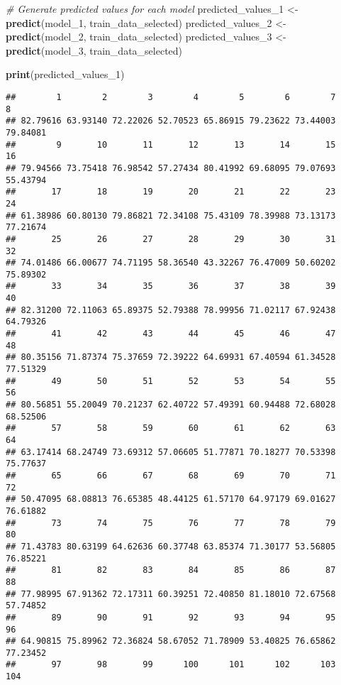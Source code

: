\documentclass[
]{article}
\newenvironment{Shaded}{\begin{snugshade}}{\end{snugshade}}
\newcommand{\CommentTok}[1]{\textcolor[rgb]{0.56,0.35,0.01}{\textit{#1}}}
\newcommand{\FunctionTok}[1]{\textcolor[rgb]{0.13,0.29,0.53}{\textbf{#1}}}
\newcommand{\NormalTok}[1]{#1}
\newcommand{\OtherTok}[1]{\textcolor[rgb]{0.56,0.35,0.01}{#1}}
\begin{document}
\begin{Shaded}
\begin{Highlighting}[]
\CommentTok{\# Generate predicted values for each model}
\NormalTok{predicted\_values\_1 }\OtherTok{\textless{}{-}} \FunctionTok{predict}\NormalTok{(model\_1, train\_data\_selected)}
\NormalTok{predicted\_values\_2 }\OtherTok{\textless{}{-}} \FunctionTok{predict}\NormalTok{(model\_2, train\_data\_selected)}
\NormalTok{predicted\_values\_3 }\OtherTok{\textless{}{-}} \FunctionTok{predict}\NormalTok{(model\_3, train\_data\_selected)}

\FunctionTok{print}\NormalTok{(predicted\_values\_1)}
\end{Highlighting}
\end{Shaded}

\begin{verbatim}
##        1        2        3        4        5        6        7        8 
## 82.79616 63.93140 72.22026 52.70523 65.86915 79.23622 73.44003 79.84081 
##        9       10       11       12       13       14       15       16 
## 79.94566 73.75418 76.98542 57.27434 80.41992 69.68095 79.07693 55.43794 
##       17       18       19       20       21       22       23       24 
## 61.38986 60.80130 79.86821 72.34108 75.43109 78.39988 73.13173 77.21674 
##       25       26       27       28       29       30       31       32 
## 74.01486 66.00677 74.71195 58.36540 43.32267 76.47009 50.60202 75.89302 
##       33       34       35       36       37       38       39       40 
## 82.31200 72.11063 65.89375 52.79388 78.99956 71.02117 67.92438 64.79326 
##       41       42       43       44       45       46       47       48 
## 80.35156 71.87374 75.37659 72.39222 64.69931 67.40594 61.34528 77.51329 
##       49       50       51       52       53       54       55       56 
## 80.56851 55.20049 70.21237 62.40722 57.49391 60.94488 72.68028 68.52506 
##       57       58       59       60       61       62       63       64 
## 63.17414 68.24749 73.69312 57.06605 51.77871 70.18277 70.53398 75.77637 
##       65       66       67       68       69       70       71       72 
## 50.47095 68.08813 76.65385 48.44125 61.57170 64.97179 69.01627 76.61882 
##       73       74       75       76       77       78       79       80 
## 71.43783 80.63199 64.62636 60.37748 63.85374 71.30177 53.56805 76.85221 
##       81       82       83       84       85       86       87       88 
## 77.98995 67.91362 72.17311 60.39251 72.40850 81.18010 72.67568 57.74852 
##       89       90       91       92       93       94       95       96 
## 64.90815 75.89962 72.36824 58.67052 71.78909 53.40825 76.65862 77.23452 
##       97       98       99      100      101      102      103      104 

\end{verbatim}
\end{document}
